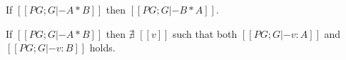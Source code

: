 \begin{lemma}\label{lemma:rev:poly:disj:symmetry}
  If $[[PG ; G |- A * B]]$
  then $[[PG ; G |- B * A]]$.
\end{lemma}

\begin{lemma}\label{lemma:rev:poly:disj:exclusive}
  If $[[PG ; G |- A * B]]$ then $\nexists$ $[[v]]$ such that both
  $[[PG ; G |- v : A]]$ and $[[PG ; G |- v : B]]$ holds.
\end{lemma}




